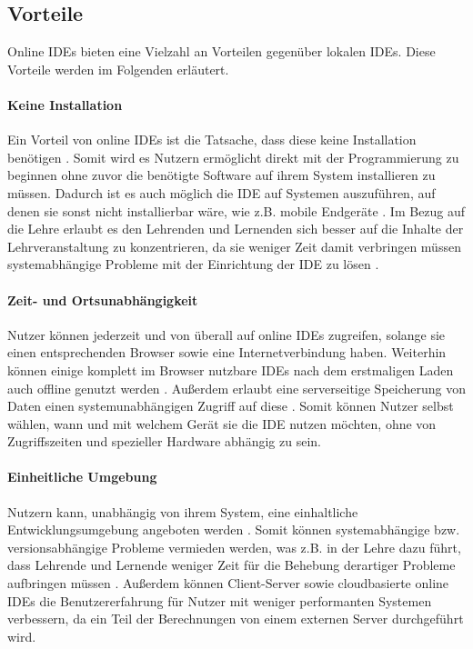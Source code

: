 \subsection{Vorteile}\label{section:stand-der-technik:literaturrecherche:vorteile}

Online IDEs bieten eine Vielzahl an Vorteilen gegenüber lokalen IDEs. Diese Vorteile werden im Folgenden erläutert.

\paragraph{Keine Installation}
Ein Vorteil von online IDEs ist die Tatsache, dass diese keine Installation benötigen \cite{srinivasa_bad_2022}\cite{tran_interactive_2013}\cite{yang_evaluations_2018}. Somit wird es Nutzern ermöglicht direkt mit der Programmierung zu beginnen ohne zuvor die benötigte Software auf ihrem System installieren zu müssen. Dadurch ist es auch möglich die IDE auf Systemen auszuführen, auf denen sie sonst nicht installierbar wäre, wie z.B. mobile Endgeräte \cite{jefferson_pyodideu_2024}\cite{ball_beyond_2015}\cite{uehara_javascript_2019}. Im Bezug auf die Lehre erlaubt es den Lehrenden und Lernenden sich besser auf die Inhalte der Lehrveranstaltung zu konzentrieren, da sie weniger Zeit damit verbringen müssen systemabhängige Probleme mit der Einrichtung der IDE zu lösen \cite{valez_student_2020}.

\paragraph{Zeit- und Ortsunabhängigkeit}
Nutzer können jederzeit und von überall auf online IDEs zugreifen, solange sie einen entsprechenden Browser sowie eine Internetverbindung haben. Weiterhin können einige komplett im Browser nutzbare IDEs nach dem erstmaligen Laden auch offline genutzt werden \cite{jefferson_pyodideu_2024}. Außerdem erlaubt eine serverseitige Speicherung von Daten einen systemunabhängigen Zugriff auf diese \cite{ball_beyond_2015}. Somit können Nutzer selbst wählen, wann und mit welchem Gerät sie die IDE nutzen möchten, ohne von Zugriffszeiten und spezieller Hardware abhängig zu sein.

\paragraph{Einheitliche Umgebung}
Nutzern kann, unabhängig von ihrem System, eine einhaltliche Entwicklungsumgebung angeboten werden \cite{molnar_evaluation_2023}\cite{tran_interactive_2013}. Somit können systemabhängige bzw. versionsabhängige Probleme vermieden werden, was z.B. in der Lehre dazu führt, dass Lehrende und Lernende weniger Zeit für die Behebung derartiger Probleme aufbringen müssen \cite{valez_student_2020}. Außerdem können Client-Server sowie cloudbasierte online IDEs die Benutzererfahrung für Nutzer mit weniger performanten Systemen verbessern, da ein Teil der Berechnungen von einem externen Server durchgeführt wird.

